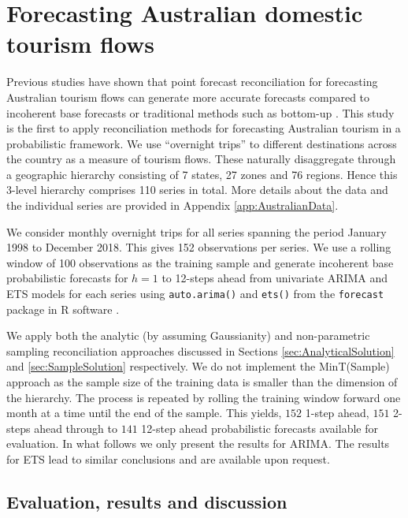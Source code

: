 \documentclass[12pt]{article}
\theoremstyle{definition}
\begin{document}
\section{Forecasting Australian domestic tourism flows}\label{sec:Application}

Previous studies have shown that point forecast reconciliation for forecasting Australian tourism flows can generate more accurate forecasts compared to incoherent base forecasts or traditional methods such as bottom-up \citep[see for example,][]{AthEtAl2009, HynEtAl2011, WicEtAl2019}. This study is the first to apply reconciliation methods for forecasting Australian tourism in a probabilistic framework. We use ``overnight trips'' to different destinations across the country as a measure of tourism flows. These naturally disaggregate through a geographic hierarchy consisting of 7 states, 27 zones and 76 regions. Hence this 3-level hierarchy comprises 110 series in total. More details about the data and the individual series are provided in Appendix \ref{app:AustralianData}.

We consider monthly overnight trips for all series spanning the period January 1998 to December 2018. This gives 152 observations per series. We use a rolling window of 100 observations as the training sample and generate incoherent base probabilistic forecasts for $h=1$ to 12-steps ahead from univariate ARIMA and ETS models for each series using \verb|auto.arima()| and \verb|ets()| from the \verb|forecast| package \citep{Rforecast} in R software \citep{Rcore}.

We apply both the analytic (by assuming Gaussianity) and non-parametric sampling reconciliation approaches discussed in Sections \ref{sec:AnalyticalSolution} and \ref{sec:SampleSolution} respectively.
We do not implement the MinT(Sample) approach as the sample size of the training data is smaller than the dimension of the hierarchy.
The process is repeated by rolling the training window forward one month at a time until the end of the sample. This yields, $152$ 1-step ahead, $151$ 2-steps ahead through to $141$ 12-step ahead probabilistic forecasts available for evaluation. In what follows we only present the results for ARIMA. The results for ETS lead to similar conclusions and are available upon request.


\subsection{Evaluation, results and discussion}
\end{document}
